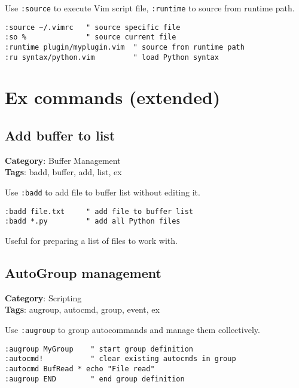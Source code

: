 {{{{{{Use {\footnotesize \Verb§:source§} to execute Vim script file, {\footnotesize \Verb§:runtime§} to source from runtime path.

\begin{Exa*}{}
\begin{Verbatim}[fontsize=\footnotesize, breaklines, breakanywhere]
:source ~/.vimrc   " source specific file
:so %              " source current file
:runtime plugin/myplugin.vim  " source from runtime path
:ru syntax/python.vim         " load Python syntax
\end{Verbatim}
\end{Exa*}

\chapter{Ex commands (extended)}
\section{Add buffer to list}

\textbf{Category}: Buffer Management\\ \textbf{Tags}: badd, buffer, add, list, ex
\vspace{0.5cm}

Use {\footnotesize \Verb§:badd§} to add file to buffer list without editing it.

\begin{Exa*}{}
\begin{Verbatim}[fontsize=\footnotesize, breaklines, breakanywhere]
:badd file.txt     " add file to buffer list
:badd *.py         " add all Python files
\end{Verbatim}
\end{Exa*}

Useful for preparing a list of files to work with.

\section{AutoGroup management}

\textbf{Category}: Scripting\\ \textbf{Tags}: augroup, autocmd, group, event, ex
\vspace{0.5cm}

Use {\footnotesize \Verb§:augroup§} to group autocommands and manage them collectively.

\begin{Exa*}{}
\begin{Verbatim}[fontsize=\footnotesize, breaklines, breakanywhere]
:augroup MyGroup    " start group definition
:autocmd!           " clear existing autocmds in group
:autocmd BufRead * echo "File read"
:augroup END        " end group definition
\end{Verbatim}
\end{Exa*}

}}}}}}
